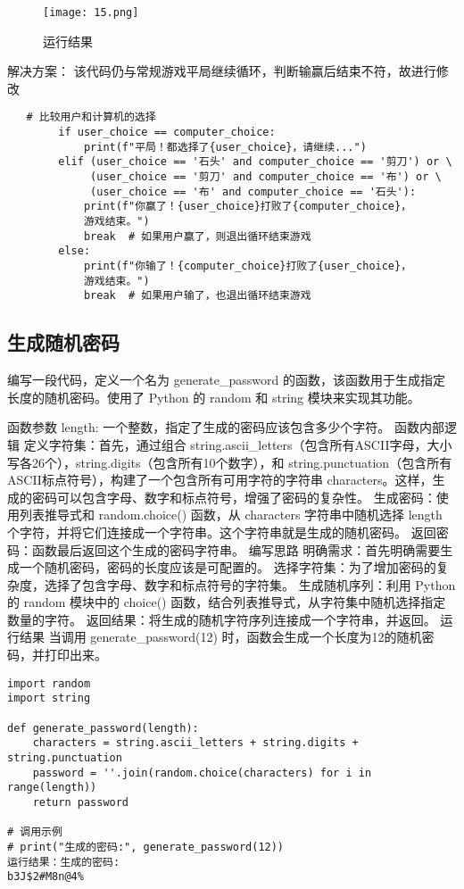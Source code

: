 \documentclass[a4paper, 12pt]{article}
\begin{document}
    \begin{figure}[H]
  \centering
    \texttt{[image: 15.png]}
  \caption{运行结果}
   \end{figure}  

解决方案：
该代码仍与常规游戏平局继续循环，判断输赢后结束不符，故进行修改
\begin{lstlisting}
   # 比较用户和计算机的选择  
        if user_choice == computer_choice:  
            print(f"平局！都选择了{user_choice}，请继续...")  
        elif (user_choice == '石头' and computer_choice == '剪刀') or \  
             (user_choice == '剪刀' and computer_choice == '布') or \  
             (user_choice == '布' and computer_choice == '石头'):  
            print(f"你赢了！{user_choice}打败了{computer_choice}，
            游戏结束。")  
            break  # 如果用户赢了，则退出循环结束游戏  
        else:  
            print(f"你输了！{computer_choice}打败了{user_choice}，
            游戏结束。")  
            break  # 如果用户输了，也退出循环结束游戏 
\end{lstlisting} 

\subsection{生成随机密码} 
编写一段代码，定义一个名为 generate\_password 的函数，该函数用于生成指定长度的随机密码。使用了 Python 的 random 和 string 模块来实现其功能。

函数参数
length: 一个整数，指定了生成的密码应该包含多少个字符。
函数内部逻辑
定义字符集：首先，通过组合 string.ascii\_letters（包含所有ASCII字母，大小写各26个），string.digits（包含所有10个数字），和 string.punctuation（包含所有ASCII标点符号），构建了一个包含所有可用字符的字符串 characters。这样，生成的密码可以包含字母、数字和标点符号，增强了密码的复杂性。
生成密码：使用列表推导式和 random.choice() 函数，从 characters 字符串中随机选择 length 个字符，并将它们连接成一个字符串。这个字符串就是生成的随机密码。
返回密码：函数最后返回这个生成的密码字符串。
编写思路
明确需求：首先明确需要生成一个随机密码，密码的长度应该是可配置的。
选择字符集：为了增加密码的复杂度，选择了包含字母、数字和标点符号的字符集。
生成随机序列：利用 Python 的 random 模块中的 choice() 函数，结合列表推导式，从字符集中随机选择指定数量的字符。
返回结果：将生成的随机字符序列连接成一个字符串，并返回。
运行结果
当调用 generate\_password(12) 时，函数会生成一个长度为12的随机密码，并打印出来。 
\begin{lstlisting}
import random
import string

def generate_password(length):
    characters = string.ascii_letters + string.digits + string.punctuation
    password = ''.join(random.choice(characters) for i in range(length))
    return password

# 调用示例
# print("生成的密码:", generate_password(12))
运行结果：生成的密码:
b3J$2#M8n@4%
\end{lstlisting}
\end{document}
